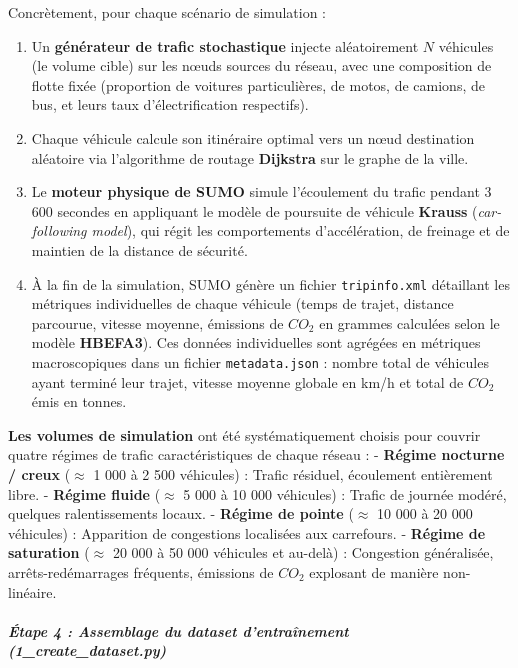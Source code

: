 \documentclass[10pt, a4paper]{article}
\providecommand{\tightlist}{}
\begin{document}
Concrètement, pour chaque scénario de simulation :

\begin{enumerate}
\def\labelenumi{\arabic{enumi}.}
\tightlist
\item
  Un \textbf{générateur de trafic stochastique} injecte aléatoirement
  \(N\) véhicules (le volume cible) sur les nœuds sources du réseau,
  avec une composition de flotte fixée (proportion de voitures
  particulières, de motos, de camions, de bus, et leurs taux
  d'électrification respectifs).
\item
  Chaque véhicule calcule son itinéraire optimal vers un nœud
  destination aléatoire via l'algorithme de routage \textbf{Dijkstra}
  sur le graphe de la ville.
\item
  Le \textbf{moteur physique de SUMO} simule l'écoulement du trafic
  pendant 3 600 secondes en appliquant le modèle de poursuite de
  véhicule \textbf{Krauss} (\emph{car-following model}), qui régit les
  comportements d'accélération, de freinage et de maintien de la
  distance de sécurité.
\item
  À la fin de la simulation, SUMO génère un fichier
  \texttt{tripinfo.xml} détaillant les métriques individuelles de chaque
  véhicule (temps de trajet, distance parcourue, vitesse moyenne,
  émissions de \(CO_2\) en grammes calculées selon le modèle
  \textbf{HBEFA3}). Ces données individuelles sont agrégées en métriques
  macroscopiques dans un fichier \texttt{metadata.json} : nombre total
  de véhicules ayant terminé leur trajet, vitesse moyenne globale en
  km/h et total de \(CO_2\) émis en tonnes.
\end{enumerate}

\textbf{Les volumes de simulation} ont été systématiquement choisis pour
couvrir quatre régimes de trafic caractéristiques de chaque réseau : -
\textbf{Régime nocturne / creux} (\(\approx\) 1 000 à 2 500 véhicules) :
Trafic résiduel, écoulement entièrement libre. - \textbf{Régime fluide}
(\(\approx\) 5 000 à 10 000 véhicules) : Trafic de journée modéré,
quelques ralentissements locaux. - \textbf{Régime de pointe}
(\(\approx\) 10 000 à 20 000 véhicules) : Apparition de congestions
localisées aux carrefours. - \textbf{Régime de saturation} (\(\approx\)
20 000 à 50 000 véhicules et au-delà) : Congestion généralisée,
arrêts-redémarrages fréquents, émissions de \(CO_2\) explosant de
manière non-linéaire.

\subparagraph{Étape 4 : Assemblage du dataset d'entraînement
(1\_create\_dataset.py)}\label{uxe9tape-4-assemblage-du-dataset-dentrauxeenement-1_create_dataset.py}
\end{document}
